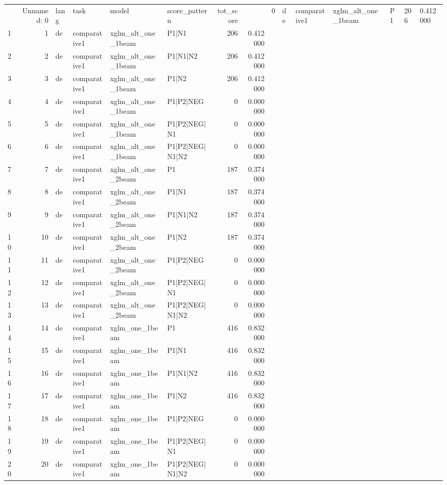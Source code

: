 \begin{tabular}{lrllllrr}
\toprule
 & Unnamed: 0 & lang & task & model & score_pattern & tot_score & %
 & 0 & de & comparative1 & xglm_alt_one_1beam & P1 & 206 & 0.412000 \\
1 & 1 & de & comparative1 & xglm_alt_one_1beam & P1|N1 & 206 & 0.412000 \\
2 & 2 & de & comparative1 & xglm_alt_one_1beam & P1|N1|N2 & 206 & 0.412000 \\
3 & 3 & de & comparative1 & xglm_alt_one_1beam & P1|N2 & 206 & 0.412000 \\
4 & 4 & de & comparative1 & xglm_alt_one_1beam & P1|P2|NEG & 0 & 0.000000 \\
5 & 5 & de & comparative1 & xglm_alt_one_1beam & P1|P2|NEG|N1 & 0 & 0.000000 \\
6 & 6 & de & comparative1 & xglm_alt_one_1beam & P1|P2|NEG|N1|N2 & 0 & 0.000000 \\
7 & 7 & de & comparative1 & xglm_alt_one_2beam & P1 & 187 & 0.374000 \\
8 & 8 & de & comparative1 & xglm_alt_one_2beam & P1|N1 & 187 & 0.374000 \\
9 & 9 & de & comparative1 & xglm_alt_one_2beam & P1|N1|N2 & 187 & 0.374000 \\
10 & 10 & de & comparative1 & xglm_alt_one_2beam & P1|N2 & 187 & 0.374000 \\
11 & 11 & de & comparative1 & xglm_alt_one_2beam & P1|P2|NEG & 0 & 0.000000 \\
12 & 12 & de & comparative1 & xglm_alt_one_2beam & P1|P2|NEG|N1 & 0 & 0.000000 \\
13 & 13 & de & comparative1 & xglm_alt_one_2beam & P1|P2|NEG|N1|N2 & 0 & 0.000000 \\
14 & 14 & de & comparative1 & xglm_one_1beam & P1 & 416 & 0.832000 \\
15 & 15 & de & comparative1 & xglm_one_1beam & P1|N1 & 416 & 0.832000 \\
16 & 16 & de & comparative1 & xglm_one_1beam & P1|N1|N2 & 416 & 0.832000 \\
17 & 17 & de & comparative1 & xglm_one_1beam & P1|N2 & 416 & 0.832000 \\
18 & 18 & de & comparative1 & xglm_one_1beam & P1|P2|NEG & 0 & 0.000000 \\
19 & 19 & de & comparative1 & xglm_one_1beam & P1|P2|NEG|N1 & 0 & 0.000000 \\
20 & 20 & de & comparative1 & xglm_one_1beam & P1|P2|NEG|N1|N2 & 0 & 0.000000 \\

\end{tabular}
